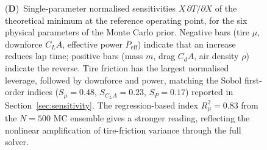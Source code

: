 \begin{figure}[!htbp]
{    (\textbf{D})~Single-parameter normalised sensitivities $X\,\partial T/\partial X$ of the theoretical minimum at the reference operating point, for the six physical parameters of the Monte Carlo prior. Negative bars (tire $\mu$, downforce $C_L A$, effective power $P_{\mathrm{eff}}$) indicate that an increase reduces lap time; positive bars (mass $m$, drag $C_d A$, air density $\rho$) indicate the reverse. Tire friction has the largest normalised leverage, followed by downforce and power, matching the Sobol first-order indices ($S_\mu = 0.48$, $S_{C_LA} = 0.23$, $S_P = 0.17$) reported in Section~\ref{sec:sensitivity}. The regression-based index $R^2_\mu = 0.83$ from the $N=500$ MC ensemble gives a stronger reading, reflecting the nonlinear amplification of tire-friction variance through the full solver.}
    \label{fig:panel3}
\end{figure}

